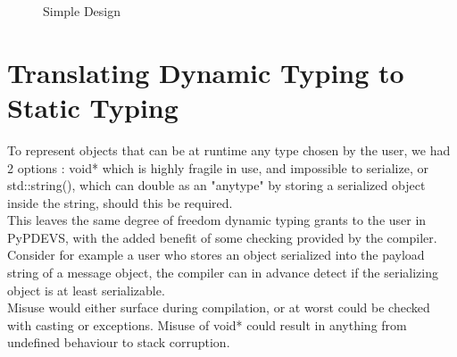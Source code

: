 \documentclass[8pt,a4paper]{report}
\begin{document}
\begin{figure}[h!]
	\caption{Simple Design}
	\label{simpledesign}
\end{figure}

\section{Translating Dynamic Typing to Static Typing}
To represent objects that can be at runtime any type chosen by the user, we had 2 options : void* which is highly fragile in use, and impossible to serialize, or std::string(), which can double as an "anytype" by storing a serialized object inside the string, should this be required. \\This leaves the same degree of freedom dynamic typing grants to the user in PyPDEVS, with the added benefit of some checking provided by the compiler. Consider for example a user who stores an object serialized into the payload string of a message object, the compiler can in advance detect if the serializing object is at least serializable. \\ Misuse would either surface during compilation, or at worst could be checked with casting or exceptions. Misuse of void* could result in anything from undefined behaviour to stack corruption.
\end{document}
